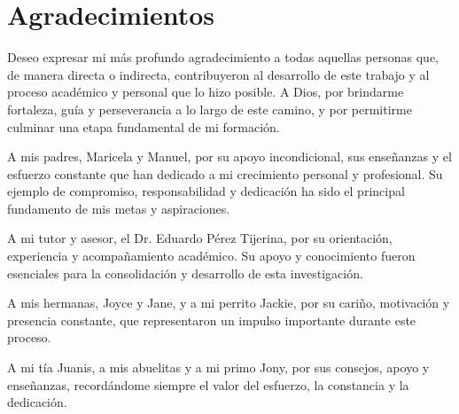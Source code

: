 \documentclass[12pt]{article}
\begin{document}
\begin{abstract}
Los resultados demuestran que es posible reconstruir propiedades
internas del sistema a partir de mediciones externas de
bioimpedancia. El modelo inverso, basado en una red neuronal
entrenada con datos sintéticos físicamente fundamentados, logra
estimar parámetros fisiológicos clave ---incluyendo la conductividad
de base $\sigma_{\text{base}}$, la conductancia de sodio $g_{Na}$
y el tiempo de relajación $\tau$--- con errores relativos (MAPE)
de \textbf{2.9\%}, \textbf{5.8\%} y \textbf{14.0\%},
respectivamente, sobre el conjunto de prueba. Parámetros
adicionales como la conductancia de potasio $g_K$ y el exponente
Cole-Cole $\alpha_{\text{CC}}$ presentan errores medianos de
9.9\% y 14.0\%, reflejando la mayor dificultad intrínseca de su
identificación a partir del espectro de impedancia. Este trabajo
establece un marco teórico que integra física fundamental,
modelación biológica y herramientas computacionales, proponiendo
una nueva interpretación de la bioimpedancia no solo como
herramienta de medición, sino como una ventana hacia la dinámica
interna de sistemas vivos.
\end{abstract}
\section*{Agradecimientos}
Deseo expresar mi más profundo agradecimiento a todas aquellas personas que, de manera directa o indirecta, contribuyeron al desarrollo de este trabajo y al proceso académico y personal que lo hizo posible.
A Dios, por brindarme fortaleza, guía y perseverancia a lo largo de este camino, y por permitirme culminar una etapa fundamental de mi formación.

A mis padres, Maricela y Manuel, por su apoyo incondicional, sus enseñanzas y el esfuerzo constante que han dedicado a mi crecimiento personal y profesional. Su ejemplo de compromiso, responsabilidad y dedicación ha sido el principal fundamento de mis metas y aspiraciones.


A mi tutor y asesor, el Dr. Eduardo Pérez Tijerina, por su orientación, experiencia y acompañamiento académico. Su apoyo y conocimiento fueron esenciales para la consolidación y desarrollo de esta investigación.

A mis hermanas, Joyce y Jane, y a mi perrito Jackie, por su cariño, motivación y presencia constante, que representaron un impulso importante durante este proceso.

A mi tía Juanis, a mis abuelitas y a mi primo Jony, por sus consejos, apoyo y enseñanzas, recordándome siempre el valor del esfuerzo, la constancia y la dedicación.
\end{document}
